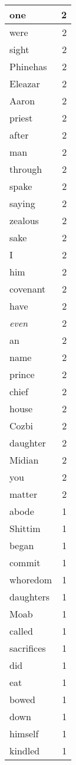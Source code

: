 \begin{center}
\begin{longtable}{l|r}
one & 2\\ \hline 
were & 2\\ \hline 
sight & 2\\ \hline 
Phinehas & 2\\ \hline 
Eleazar & 2\\ \hline 
Aaron & 2\\ \hline 
priest & 2\\ \hline 
after & 2\\ \hline 
man & 2\\ \hline 
through & 2\\ \hline 
spake & 2\\ \hline 
saying & 2\\ \hline 
zealous & 2\\ \hline 
sake & 2\\ \hline 
I & 2\\ \hline 
him & 2\\ \hline 
covenant & 2\\ \hline 
have & 2\\ \hline 
\emph{even} & 2\\ \hline 
an & 2\\ \hline 
name & 2\\ \hline 
prince & 2\\ \hline 
chief & 2\\ \hline 
house & 2\\ \hline 
Cozbi & 2\\ \hline 
daughter & 2\\ \hline 
Midian & 2\\ \hline 
you & 2\\ \hline 
matter & 2\\ \hline 
abode & 1\\ \hline 
Shittim & 1\\ \hline 
began & 1\\ \hline 
commit & 1\\ \hline 
whoredom & 1\\ \hline 
daughters & 1\\ \hline 
Moab & 1\\ \hline 
called & 1\\ \hline 
sacrifices & 1\\ \hline 
did & 1\\ \hline 
eat & 1\\ \hline 
bowed & 1\\ \hline 
down & 1\\ \hline 
himself & 1\\ \hline 
kindled & 1\\ \hline 

\end{longtable}
\end{center}
